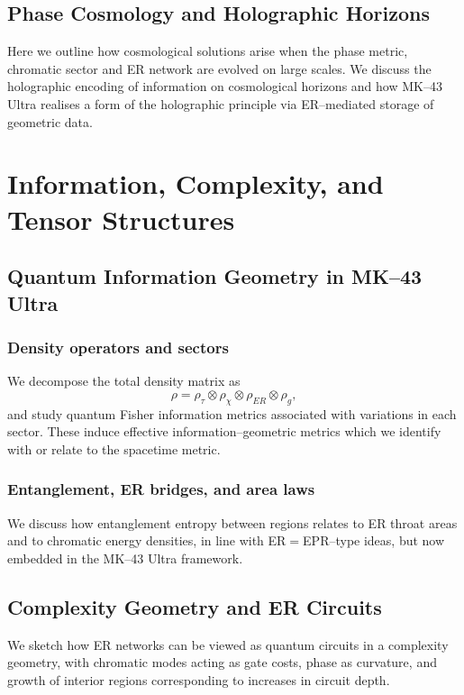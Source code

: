 \chapter{Phase Cosmology and Holographic Horizons}

Here we outline how cosmological solutions arise when the phase metric, chromatic sector and ER network are evolved on large scales.
We discuss the holographic encoding of information on cosmological horizons and how MK--43 Ultra realises a form of the holographic principle via ER--mediated storage of geometric data.

\part{Information, Complexity, and Tensor Structures}

\chapter{Quantum Information Geometry in MK--43 Ultra}

\section{Density operators and sectors}

We decompose the total density matrix as
\begin{equation}
  \rho = \rho_\tau \otimes \rho_\chi \otimes \rho_{ER} \otimes \rho_g,
\end{equation}
and study quantum Fisher information metrics associated with variations in each sector.
These induce effective information--geometric metrics which we identify with or relate to the spacetime metric.

\section{Entanglement, ER bridges, and area laws}

We discuss how entanglement entropy between regions relates to ER throat areas and to chromatic energy densities, in line with ER$=$EPR--type ideas, but now embedded in the MK--43 Ultra framework.

\chapter{Complexity Geometry and ER Circuits}

We sketch how ER networks can be viewed as quantum circuits in a complexity geometry, with chromatic modes acting as gate costs, phase as curvature, and growth of interior regions corresponding to increases in circuit depth.

